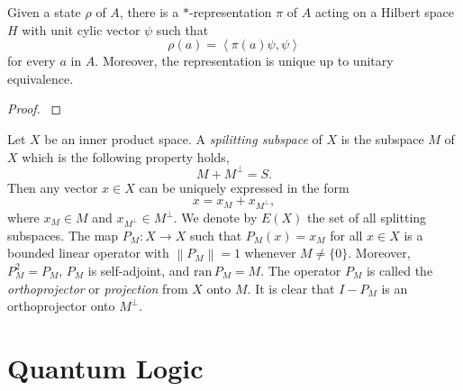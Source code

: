 \begin{theorem}
    Given a state \(\rho\) of \(A\), there is a \(\ast\)-representation \(\pi\) of \(A\) acting on a Hilbert space \(H\) with unit cylic vector \(\psi\) such that
    \[\rho(a)=\left \langle \pi(a) \psi,\psi  \right \rangle\]
    for every \(a\) in \(A\). Moreover, the representation is unique up to unitary equivalence.
\end{theorem}
\begin{proof}
    \cite[Theorem 4.5.2]{MR1468229}
\end{proof}

Let \(X\) be an inner product space. A \emph{spilitting subspace} of \(X\) is the subspace \(M\) of \(X\) which is the following property holds,
\[M+M^\perp=S.\]
Then any vector \(x \in X\) can be uniquely expressed in the form
\[x=x_M+x_{M^{\perp}},\]
where \(x_M \in M\) and \(x_{M^\perp} \in M^\perp\). We denote by \(E(X)\) the set of all splitting subspaces.
The map \(P_M:X\to X\) such that \(P_M(x)=x_M\) for all \(x \in X\) is a bounded linear operator with \(\left \lVert P_M \right \rVert=1\) whenever \(M \neq \{0\}\). Moreover, \(P^2_M=P_M\), \(P_M\) is self-adjoint, and \(\mathrm{ran}\, P_M = M\). The operator \(P_M\) is called the \emph{orthoprojector} or \emph{projection} from \(X\) onto \(M\). It is clear that \(I-P_M\) is an orthoprojector onto \(M^\perp\).
\section{Quantum Logic}


